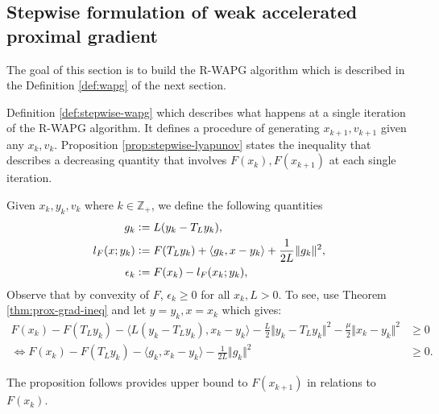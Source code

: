 \documentclass[12pt]{article}
\begin{document}
    \subsection{Stepwise formulation of weak accelerated proximal gradient}\label{sec:stepwise-stuff}
        The goal of this section is to build the R-WAPG algorithm which is described in the Definition \ref{def:wapg} of the next section. 
        \par 
        Definition \ref{def:stepwise-wapg} which describes what happens at a single iteration of the R-WAPG algorithm. 
        It defines a procedure of generating $x_{k + 1}, v_{k + 1}$ given any $x_k, v_k$. 
        Proposition \ref{prop:stepwise-lyapunov} states the inequality that describes a decreasing quantity that involves $F(x_k), F(x_{k + 1})$ at each single iteration. 
        \begin{assumption}
            Given $x_k, y_k, v_k$ where $k \in \mathbb Z_+$, we define the following quantities
            \begin{align}
                g_k &\vcentcolon= L(y_k - T_L y_k), 
                \label{eqn:grad-map}
                \\
                l_F(x; y_k) &\vcentcolon= F(T_Ly_k) + \langle g_k, x - y_k\rangle + \frac{1}{2L}\Vert g_k\Vert^2, 
                \label{eqn:lower-linearization}
                \\
                \epsilon_{k} &\vcentcolon= F(x_k) - l_F(x_k; y_k), 
                \label{eqn:regret}
            \end{align}
            Observe that by convexity of $F$, $\epsilon_k \ge 0$ for all $x_k, L > 0$. 
            To see, use Theorem \ref{thm:prox-grad-ineq} and let $y = y_k, x = x_k$ which gives: 
            \begin{align*}
                F(x_k) - F(T_Ly_k)
                - \langle L(y_k - T_Ly_k),x_k - y_k \rangle
                - \frac{L}{2}\Vert y_k - T_Ly_k\Vert^2
                - \frac{\mu}{2}\Vert x_k - y_k\Vert^2
                &\ge 0
                \\
                \iff 
                F(x_k) - F(T_Ly_k)
                - \langle g_k,x_k - y_k \rangle
                - \frac{1}{2L}\Vert g_k\Vert^2
                &\ge 0. 
            \end{align*}
        \end{assumption}
        The proposition follows provides upper bound to $F(x_{k + 1})$ in relations to $F(x_{k})$. 
\end{document}
